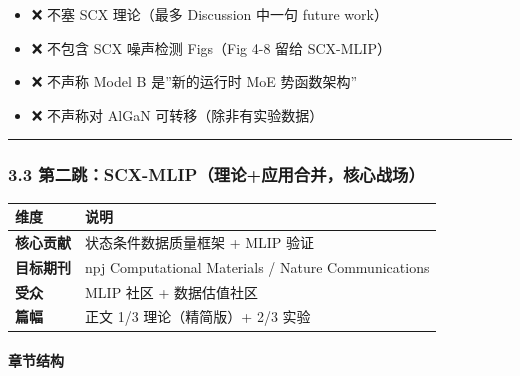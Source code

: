 \documentclass[
  12pt,
]{ctexart}
\providecommand{\tightlist}{%
  \setlength{\itemsep}{0pt}\setlength{\parskip}{0pt}}
\begin{document}
\begin{itemize}
\tightlist
\item
  ❌ 不塞 SCX 理论（最多 Discussion 中一句 future work）
\item
  ❌ 不包含 SCX 噪声检测 Figs（Fig 4-8 留给 SCX-MLIP）
\item
  ❌ 不声称 Model B 是''新的运行时 MoE 势函数架构''
\item
  ❌ 不声称对 AlGaN 可转移（除非有实验数据）
\end{itemize}

\begin{center}\rule{0.5\linewidth}{0.5pt}\end{center}

\subsubsection{3.3
第二跳：SCX-MLIP（理论+应用合并，核心战场）}\label{ux7b2cux4e8cux8df3scx-mlipux7406ux8bbaux5e94ux7528ux5408ux5e76ux6838ux5fc3ux6218ux573a}

\begin{longtable}[]{@{}ll@{}}
\toprule\noalign{}
维度 & 说明 \\
\midrule\noalign{}
\endhead
\bottomrule\noalign{}
\endlastfoot
\textbf{核心贡献} & 状态条件数据质量框架 + MLIP 验证 \\
\textbf{目标期刊} & npj Computational Materials / Nature
Communications \\
\textbf{受众} & MLIP 社区 + 数据估值社区 \\
\textbf{篇幅} & 正文 1/3 理论（精简版）+ 2/3 实验 \\
\end{longtable}

\paragraph{章节结构}\label{ux7ae0ux8282ux7ed3ux6784-1}
\end{document}
